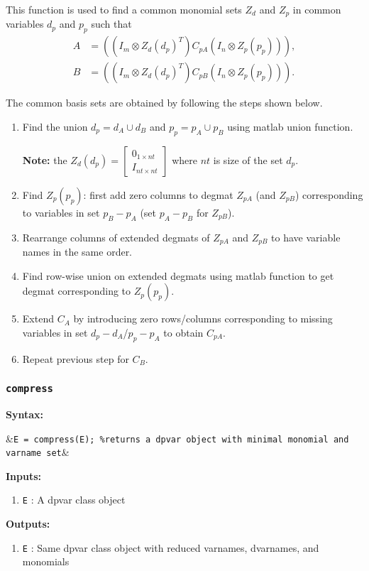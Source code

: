 \documentclass{article}
\newcommand{\bmat}[1]{\begin{bmatrix} #1\end{bmatrix}}
\begin{document}
	This function is used to find a common monomial sets $Z_d$ and $Z_p$ in common variables $d_p$ and $p_p$ such that
	\begin{align*}
		A &= \left((I_m \otimes  Z_{d}(d_p)^T) C_{pA} (I_n \otimes Z_{p}(p_p))\right),\\
		B &= \left((I_m \otimes  Z_{d}(d_p)^T) C_{pB} (I_n \otimes Z_{p}(p_p))\right).
	\end{align*}
	
	The common basis sets are obtained by following the steps shown below.
	\begin{enumerate}
		\item Find the union $d_p = d_A \cup d_B$ and $p_p = p_A\cup p_B$ using matlab union function.
		
		\textbf{Note:} the $Z_d(d_p) = \bmat{0_{1\times nt}\\I_{nt\times nt}}$ where $nt$ is size of the set $d_p$.
		\item Find $Z_p(p_p)$: first add zero columns to degmat $Z_{pA}$ (and $Z_{pB}$) corresponding to variables in set $p_B - p_A$ (set $p_A-p_B$ for $Z_{pB}$).
		\item Rearrange columns of extended degmats of $Z_{pA}$ and $Z_{pB}$ to have variable names in the same order.
		\item Find row-wise union on extended degmats using matlab function to get degmat corresponding to $Z_p(p_p)$.
		\item Extend $C_{A}$ by introducing zero rows/columns corresponding to missing variables in set $d_p-d_A$/$p_p-p_A$ to obtain $C_{pA}$.
		\item Repeat previous step for $C_B$.
	\end{enumerate}
	
	
	\subsubsection{\texttt{compress}}
	\textbf{Syntax:}
		\begin{flalign*}
			&\texttt{E = compress(E); \%returns a dpvar object with minimal monomial and varname set}&
		\end{flalign*}
	\textbf{Inputs:}
	\begin{enumerate}
		\item \texttt{E} : A dpvar class object
	\end{enumerate}
	\textbf{Outputs:}
	\begin{enumerate}
		\item \texttt{E} : Same dpvar class object with reduced varnames, dvarnames, and monomials
	\end{enumerate}
\end{document}
